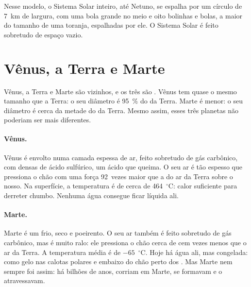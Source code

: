Nesse modelo, o Sistema Solar inteiro, até Netuno, se espalha por um
círculo de 7~km de largura, com uma bola grande no meio e oito bolinhas e
bolas, a maior do tamanho de uma toranja, espalhadas por ele. O Sistema
Solar é feito sobretudo de espaço vazio.

\section{Vênus, a Terra e Marte}

Vênus, a Terra e Marte são vizinhos, e os três são . Vênus
tem quase o mesmo tamanho que a Terra: o seu diâmetro é 95~\% do da Terra.
Marte é menor: o seu diâmetro é cerca da metade do da Terra. Mesmo assim,
esses três planetas não poderiam ser mais diferentes.

\paragraph{Vênus.} Vênus é envolto numa camada espessa de ar, feito
sobretudo de gás carbônico, com  densas de ácido sulfúrico, um ácido
que queima. O seu ar é tão espesso que pressiona o chão com uma força
92~vezes maior que a do ar da Terra sobre o nosso. Na superfície, a
temperatura é de cerca de 464~$^\circ$C: calor suficiente para derreter
chumbo. Nenhuma água consegue ficar líquida ali.

\paragraph{Marte.} Marte é um  frio, seco e poeirento. O seu ar
também é feito sobretudo de gás carbônico, mas é muito ralo: ele pressiona
o chão cerca de cem vezes menos que o ar da Terra. A temperatura média é de
$-65$~$^\circ$C. Hoje há água ali, mas congelada: como gelo nas calotas
polares e embaixo do chão perto dos . Mas Marte nem sempre foi assim:
há bilhões de anos,  corriam em Marte,  se formavam e  o
atravessavam.

